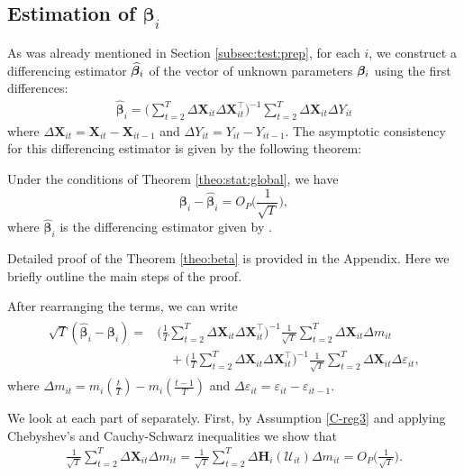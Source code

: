 \documentclass[a4paper,12pt]{article}
\makeatletter
\renewcommand{\eqref}[1]{\tagform@{\ref{#1}}}
\makeatother
\begin{document}
\subsection{Estimation of  $\bm{\beta}_i$}\label{subsec:para:beta}

As was already mentioned in Section \ref{subsec:test:prep}, for each $i$, we construct a differencing estimator $\widehat{\bm{\beta}}_i$ of the vector of unknown parameters $\bm{\beta}_i$ using the first differences:
\begin{align}\label{eq:beta:est2}
\widehat{\bm{\beta}}_i = \Big( \sum_{t=2}^T \Delta \mathbf{X}_{it} \Delta \mathbf{X}_{it}^\top \Big)^{-1} \sum_{t=2}^T \Delta \mathbf{X}_{it} \Delta Y_{it}
\end{align}
where $\Delta  \mathbf{X}_{it} =  \mathbf{X}_{it} -  \mathbf{X}_{it-1}$ and $\Delta Y_{it} = Y_{it} - Y_{i t-1}$. The asymptotic consistency for this differencing estimator is given by the following theorem:
\begin{theorem}\label{theo:beta}
Under the conditions of Theorem \ref{theo:stat:global}, we have
\[\bm{\beta}_i - \widehat{\bm{\beta}}_i  = O_P \Big(\frac{1}{\sqrt{T}}\Big),
\]
where $\widehat{\bm{\beta}}_i$ is the differencing estimator given by \eqref{eq:beta:est2}.
\end{theorem}

Detailed proof of the Theorem \ref{theo:beta} is provided in the Appendix. Here we briefly outline the main steps of the proof.

After rearranging the terms, we can write 
\begin{align}\label{eq:theo:beta}
\begin{split}
 \sqrt{T}( \widehat{\bm{\beta}}_i - \bm{\beta}_i) = &\Big( \frac{1}{T}\sum_{t=2}^T \Delta \mathbf{X}_{it} \Delta \mathbf{X}_{it}^\top \Big)^{-1} \frac{1}{\sqrt{T}}\sum_{t=2}^T \Delta \mathbf{X}_{it} \Delta m_{it}\\
&\quad+  \Big(\frac{1}{T} \sum_{t=2}^T \Delta \mathbf{X}_{it} \Delta \mathbf{X}_{it}^\top \Big)^{-1}\frac{1}{\sqrt{T}} \sum_{t=2}^T \Delta \mathbf{X}_{it} \Delta \varepsilon_{it},
\end{split}
\end{align}
where $\Delta m_{it} = m_i \left( \frac{t}{T} \right) - m_i \left(\frac{t-1}{T}\right)$ and $\Delta \varepsilon_{it} = \varepsilon_{it} - \varepsilon_{it-1}$.

We look at each part of \eqref{eq:theo:beta} separately. First, by Assumption \ref{C-reg3} and applying Chebyshev's and Cauchy-Schwarz inequalities we show that
\begin{align*}
\frac{1}{\sqrt{T}}\sum_{t=2}^T \Delta \mathbf{X}_{it} \Delta m_{it}  =\frac{1}{\sqrt{T}}\sum_{t=2}^T \Delta  \mathbf{H}_i (\mathcal{U}_{it})\Delta m_{it}= O_P\Big(\frac{1}{\sqrt{T}}\Big).
\end{align*}
\end{document}
